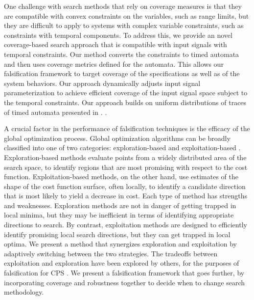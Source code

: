 One challenge with search methods that rely on coverage measures  is that they are compatible with convex constraints on the variables, such as range limits, 
but they are difficult to apply to systems with complex variable constraints, such as constraints with temporal components.
To address this, we provide an novel coverage-based search approach that is compatible with input signals with temporal constraints. Our method converts the constraints to 
timed automata and then uses coverage metrics defined for the automata.
This allows our falsification framework to target coverage of the specifications as well as of the system behaviors.
Our approach dynamically adjusts input signal parameterization to achieve
efficient coverage of the input signal space subject to
the temporal constraints. Our approach builds on uniform
distributions of traces of timed automata presented in \cite{}.
.

A crucial factor in the performance of falsification techniques is the efficacy of the global optimization process.
Global optimization algorithms can be broadly classified into one of two
categories: exploration-based and exploitation-based \cite{Blum03}.
Exploration-based methods evaluate points from a widely distributed area 
of the search space, to identify regions that are most promising with 
respect to the cost function. Exploitation-based methods, on the other hand, 
use estimates of the shape of the cost function surface, often locally, to
identify a candidate direction that is most likely to yield a decrease
in cost. Each type of method has strengths and weaknesses. Exploration
methods are not in danger of getting trapped in local minima, but they may 
be inefficient in terms of identifying appropriate directions to search.  By
contrast, exploitation methods are designed to efficiently identify
promising local search directions, but they can get trapped in local optima.
We present a method that synergizes exploration and 
exploitation by adaptively switching between the two strategies.
The tradeoffs between exploitation and exploration have been explored by others, 
for the purposes of falsification for CPS \cite{Ratschan14}. We present a falsification framework that goes further, by incorporating coverage and robustness together to decide when to change search methodology.

